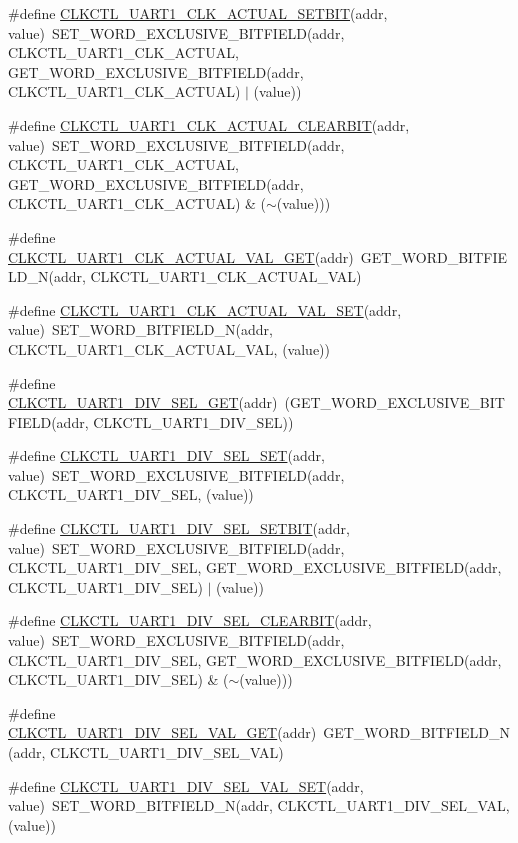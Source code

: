\begin{DoxyCompactItemize}
\item 
\#define \hyperlink{a00544_a6a7552706fc2ca7d6996ff4526507fbe}{CLKCTL\_\-UART1\_\-CLK\_\-ACTUAL\_\-SETBIT}(addr, value)~SET\_\-WORD\_\-EXCLUSIVE\_\-BITFIELD(addr, CLKCTL\_\-UART1\_\-CLK\_\-ACTUAL, GET\_\-WORD\_\-EXCLUSIVE\_\-BITFIELD(addr, CLKCTL\_\-UART1\_\-CLK\_\-ACTUAL) $|$ (value))
\item 
\#define \hyperlink{a00544_a3dcff30f9934d718a7ccaa0a036c2594}{CLKCTL\_\-UART1\_\-CLK\_\-ACTUAL\_\-CLEARBIT}(addr, value)~SET\_\-WORD\_\-EXCLUSIVE\_\-BITFIELD(addr, CLKCTL\_\-UART1\_\-CLK\_\-ACTUAL, GET\_\-WORD\_\-EXCLUSIVE\_\-BITFIELD(addr, CLKCTL\_\-UART1\_\-CLK\_\-ACTUAL) \& ($\sim$(value)))
\item 
\#define \hyperlink{a00544_a27166c178b4796a2ac35111098f1ab20}{CLKCTL\_\-UART1\_\-CLK\_\-ACTUAL\_\-VAL\_\-GET}(addr)~GET\_\-WORD\_\-BITFIELD\_\-N(addr, CLKCTL\_\-UART1\_\-CLK\_\-ACTUAL\_\-VAL)
\item 
\#define \hyperlink{a00544_a2e49228de61fec714d537e79f45f1e64}{CLKCTL\_\-UART1\_\-CLK\_\-ACTUAL\_\-VAL\_\-SET}(addr, value)~SET\_\-WORD\_\-BITFIELD\_\-N(addr, CLKCTL\_\-UART1\_\-CLK\_\-ACTUAL\_\-VAL, (value))
\item 
\#define \hyperlink{a00544_aa384643c8e7968640ac7fd991ecee809}{CLKCTL\_\-UART1\_\-DIV\_\-SEL\_\-GET}(addr)~(GET\_\-WORD\_\-EXCLUSIVE\_\-BITFIELD(addr, CLKCTL\_\-UART1\_\-DIV\_\-SEL))
\item 
\#define \hyperlink{a00544_af96533e88ce47c089e37b4ee6df1e394}{CLKCTL\_\-UART1\_\-DIV\_\-SEL\_\-SET}(addr, value)~SET\_\-WORD\_\-EXCLUSIVE\_\-BITFIELD(addr, CLKCTL\_\-UART1\_\-DIV\_\-SEL, (value))
\item 
\#define \hyperlink{a00544_a2313d0c07e1de0457a8b6df43ac29c0b}{CLKCTL\_\-UART1\_\-DIV\_\-SEL\_\-SETBIT}(addr, value)~SET\_\-WORD\_\-EXCLUSIVE\_\-BITFIELD(addr, CLKCTL\_\-UART1\_\-DIV\_\-SEL, GET\_\-WORD\_\-EXCLUSIVE\_\-BITFIELD(addr, CLKCTL\_\-UART1\_\-DIV\_\-SEL) $|$ (value))
\item 
\#define \hyperlink{a00544_aa8569268cbd6b787b42916cb89d52f07}{CLKCTL\_\-UART1\_\-DIV\_\-SEL\_\-CLEARBIT}(addr, value)~SET\_\-WORD\_\-EXCLUSIVE\_\-BITFIELD(addr, CLKCTL\_\-UART1\_\-DIV\_\-SEL, GET\_\-WORD\_\-EXCLUSIVE\_\-BITFIELD(addr, CLKCTL\_\-UART1\_\-DIV\_\-SEL) \& ($\sim$(value)))
\item 
\#define \hyperlink{a00544_a7d8a44ed7cffec4d47b0808fee7fbc63}{CLKCTL\_\-UART1\_\-DIV\_\-SEL\_\-VAL\_\-GET}(addr)~GET\_\-WORD\_\-BITFIELD\_\-N(addr, CLKCTL\_\-UART1\_\-DIV\_\-SEL\_\-VAL)
\item 
\#define \hyperlink{a00544_a77f72ceabacdd0e78d8619340a92990b}{CLKCTL\_\-UART1\_\-DIV\_\-SEL\_\-VAL\_\-SET}(addr, value)~SET\_\-WORD\_\-BITFIELD\_\-N(addr, CLKCTL\_\-UART1\_\-DIV\_\-SEL\_\-VAL, (value))

\end{DoxyCompactItemize}
